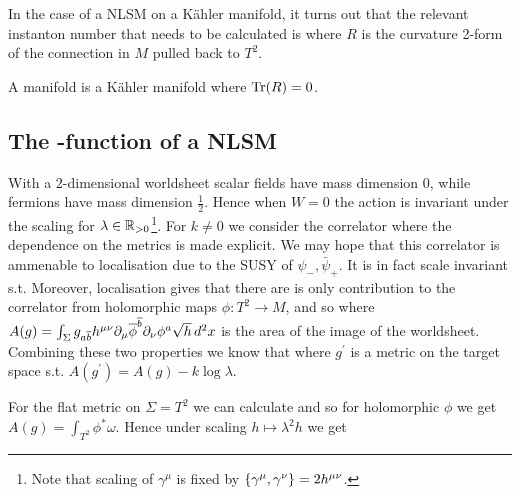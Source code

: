 \documentclass{article}
\begin{document}
In the case of a NLSM on a K\"ahler manifold, it turns out that the relevant instanton number that needs to be calculated is 
where $R$ is the curvature 2-form  of the connection in $M$ pulled back to $T^2$. 
\begin{definition}
	A  manifold is a K\"ahler manifold where $\tr(R)=0$. 
\end{definition}


\subsection{The \secmath{\beta}-function of a NLSM}
With a $2$-dimensional worldsheet scalar fields have mass dimension $0$, while fermions have mass dimension $\frac{1}{2}$. Hence when $W=0$ the action 
is invariant under the scaling 
for $\lambda \in \mbb{R}_{>0}$\footnote{Note that scaling of $\gamma^\mu$ is fixed by $\acomm[\gamma^\mu]{\gamma^\nu} = 2h^{\mu\nu}$.}. For $k \neq 0$ we consider the correlator 
where the dependence on the metrics is made explicit. We may hope that this correlator is ammenable to localisation due to the SUSY of $\psi_-,\bar{\psi}_+$. It is in fact scale invariant s.t. 
Moreover, localisation gives that there are is only contribution to the correlator from holomorphic maps $\phi : T^2 \to M$, and so 
where $A(g) = \int_{\Sigma} g_{a\bar{b}} h^{\mu\nu} \del_\mu \bar{\phi}^{\bar{b}} \del_\nu \phi^a \sqrt{h} \, d^2 x$
is the area of the image of the worldsheet. Combining these two properties we know that 
where $g^\prime$ is a metric on the target space s.t. $A(g^\prime) = A(g) - k\log \lambda$.
\begin{example}
For the flat metric on $\Sigma = T^2$ we can calculate 
and so for holomorphic $\phi$ we get $A(g) = \int_{T^2} \phi^\ast \omega$. Hence under scaling $h \mapsto \lambda^2 h$ we get 
\end{example}
\end{document}
